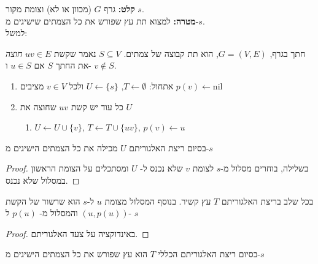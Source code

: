 \textbf{קלט:}
גרף $G$ (מכוון או לא) וצומת מקור $s$.
\\
\textbf{מטרה:}
למצוא תת עץ שפורש את כל הצמתים שישיגים מ-$s$.
\\
למשל:
\begin{center}
\end{center}

\begin{definition}[חתך]
חתך בגרף,
$G = (V, E)$,
הוא תת קבוצה של צמתים. 
$S \subseteq V$
נאמר שקשת 
$uv \in E$
\emph{חוצה}
את החתך $S$ אם
$u \in S$
ו-%
$v \notin S$.
\end{definition}
\begin{enumerate}
\item 
אתחול:
$T \leftarrow \emptyset$, 
$U \leftarrow \{s\}$
ולכל 
$v \in V$
מציבים 
$p(v) \leftarrow \text{nil}$
\item
כל עוד יש קשת
$uv$
שחוצה את $U$
	\begin{enumerate}
	\item
	$U \leftarrow U \cup \{v\}$,
	$T \leftarrow T \cup \{uv\}$,
	$p(v) \leftarrow u$
	\end{enumerate}
\end{enumerate}

\begin{claim}
בסיום ריצת האלגוריתם
$U$
מכילה את כל הצמתים הישיגים מ-$s$
\end{claim}
\begin{proof}
בשלילה, בוחרים מסלול מ-$s$ לצומת $v$ שלא נכנס ל-%
$U$
ומסתכלים על הצומת הראשון במסלול שלא נכנס.
\end{proof}
\begin{claim}
בכל שלב בריצת האלגוריתם
$T$
עץ קשיר.
בנוסף המסלול מצומת $u$ ל-$s$ הוא שרשור של הקשת 
$(u, p(u))$
והמסלול מ-%
$p(u)$
ל-%
$s$
\end{claim}
\begin{proof}
באינדוקציה על צעד האלגוריתם.
\end{proof}
\begin{theorem}
בסיום ריצת האלגוריתם הכללי $T$ הוא עץ שפורש את כל הצמתים הישיגים מ-$s$
\end{theorem}







